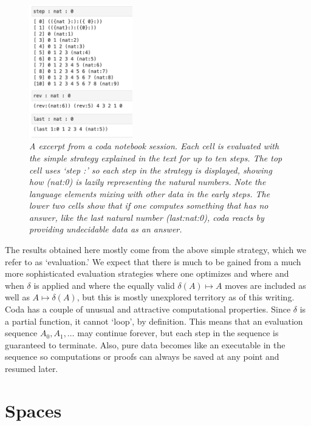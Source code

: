 \documentclass[11pt]{article}
\begin{document}
\begin{figure}[h]
\centering
\includegraphics[width=0.4\textwidth]{nat.png}
\caption{{\it A excerpt from a coda notebook session\cite{github}.  Each cell is evaluated with the simple strategy explained in the text for up to ten 
steps.  The top cell uses `step :' so each step in the strategy is displayed, showing how (nat:0) is lazily representing the natural numbers.  Note the language 
elements mixing with other data in the early steps. The lower two cells show that if one computes something that has no answer, like the last natural number (last:nat:0), coda reacts by providing undecidable data as an answer.}}
\end{figure} 

    The results obtained here mostly come from the above simple strategy, which we refer to as `evaluation.'  
We expect that there is much to be gained from a much more sophisticated evaluation strategies 
where one optimizes and where and when $\delta$ is applied and where the equally valid $\delta(A)\mapsto A$ moves are included as well 
as $A\mapsto\delta(A)$, but this is mostly unexplored territory as of this writing.  Coda has a couple of unusual and attractive computational properties.  
Since $\delta$ is a partial function, it cannot `loop', by definition.  This means that an evaluation sequence $A_0,A_1,\dots$ may continue forever, 
but each step in the sequence is guaranteed to terminate.  Also, pure data becomes like an executable in the sequence so computations or 
proofs can always be saved at any point and resumed later.  

\section{Spaces}
\end{document}
